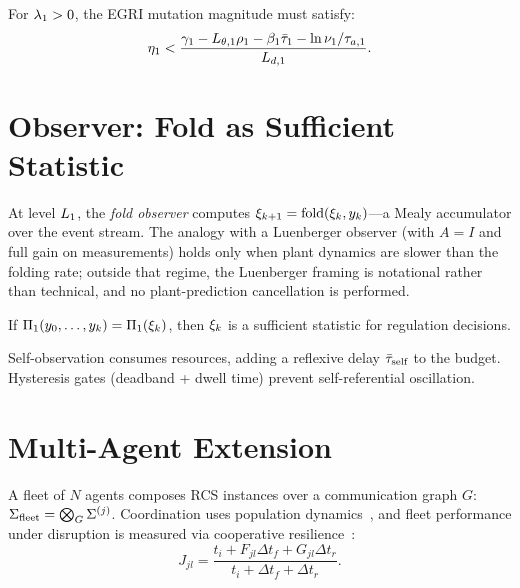 \documentclass[conference]{IEEEtran}
\begin{document}
\begin{proposition}
For $\lambda_1 > 0$, the EGRI mutation magnitude must satisfy:
\begin{equation}
  \eta_1 < \frac{\decay_1 - L_{\param,1}\rho_1 - \beta_1\taubar_1
  - \ln\nu_1/\taua[1]}{L_{d,1}}.
\end{equation}
\end{proposition}

\section{Observer: Fold as Sufficient Statistic}
\label{sec:observer}

\begin{definition}
\label{def:fold}
At level $L_{1}$, the \emph{fold observer} computes
$\xi_{k+1} = \text{fold}(\xi_k, y_k)$---a Mealy
accumulator over the event stream.  The analogy with a Luenberger
observer (with $A = I$ and full gain on measurements) holds only when
plant dynamics are slower than the folding rate; outside that regime,
the Luenberger framing is notational rather than technical, and no
plant-prediction cancellation is performed.
\end{definition}

\begin{proposition}[Sufficiency]
If $\Pi_1(y_0, \ldots, y_k) = \Pi_1(\xi_k)$, then $\xi_k$
is a sufficient statistic for regulation decisions.
\end{proposition}

Self-observation consumes resources, adding a reflexive delay
$\bar{\tau}_{\text{self}}$ to the budget.  Hysteresis gates (deadband + dwell
time) prevent self-referential oscillation.

\section{Multi-Agent Extension}
\label{sec:fleet}

A fleet of $N$ agents composes RCS instances over a communication graph
$G$: $\Sigma_{\text{fleet}} = \bigotimes_G \Sigma^{(j)}$.  Coordination uses
population dynamics~\cite{quijano2017population}, and fleet performance under
disruption is measured via cooperative
resilience~\cite{chacon2025cooperative}:
\begin{equation}
  J_{jl} = \frac{t_i + F_{jl}\Delta t_f + G_{jl}\Delta t_r}
  {t_i + \Delta t_f + \Delta t_r}.
\end{equation}
\end{document}
